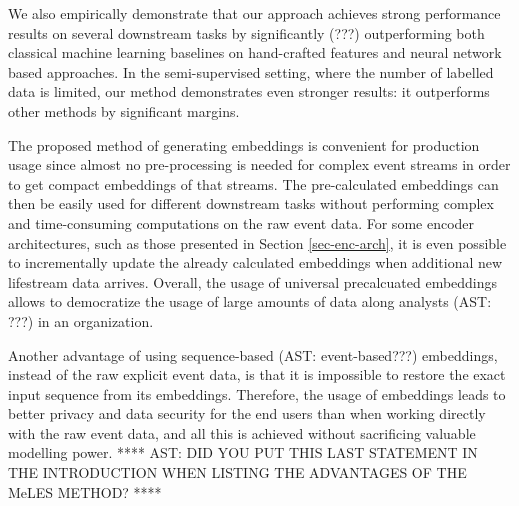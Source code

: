 \documentclass[sigconf, anonymous]{acmart}
\begin{document}
We also empirically demonstrate that our approach achieves strong performance results on several downstream tasks by significantly (???) outperforming both classical machine learning baselines on hand-crafted features and neural network based approaches.
In the semi-supervised setting, where the number of labelled data is limited, our method demonstrates even stronger results: it outperforms other methods by significant margins.

The proposed method of generating embeddings is convenient for production usage since almost no pre-processing is needed for complex event streams in order to get compact embeddings of that streams. The pre-calculated embeddings can then be easily used for different downstream tasks without performing complex and time-consuming computations on the raw event data. For some encoder architectures, such as those presented in Section \ref{sec-enc-arch}, it is even possible to incrementally update the already calculated embeddings when additional new lifestream data arrives. Overall, the usage of universal precalcuated embeddings allows to democratize the usage of large amounts of data along analysts (AST: ???) in an organization.

Another advantage of using sequence-based (AST: event-based???) embeddings, instead of the raw explicit event data, is that it is impossible to restore the exact input sequence from its embeddings. Therefore, the usage of embeddings leads to better privacy and data security for the end users than when working directly with the raw event data, and all this is achieved without sacrificing valuable modelling power.
**** AST: DID YOU PUT THIS LAST STATEMENT IN THE INTRODUCTION WHEN LISTING THE ADVANTAGES OF THE MeLES METHOD? ****




\end{document}
